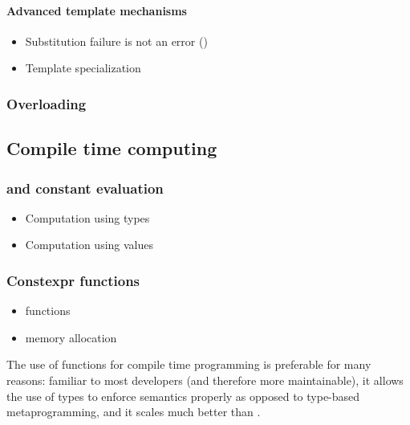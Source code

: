 \documentclass[../main]{subfiles}
\begin{document}
\paragraph{Advanced \cpp template mechanisms}

\begin{itemize}
\item Substitution failure is not an error (\sfinae)
\item Template specialization
\end{itemize}

\subsubsection{Overloading}

\subsection{Compile time computing}

\subsubsection{\Tmp and constant evaluation}

\begin{itemize}
\item Computation using types
\item Computation using values
\end{itemize}

\subsubsection{Constexpr functions}

\begin{itemize}
\item \constexpr functions
\item \constexpr memory allocation
\end{itemize}

The use of \constexpr functions for compile time programming is preferable
for many reasons: familiar to most \cpp developers (and therefore more
maintainable), it allows the use of types to enforce semantics properly
as opposed to type-based metaprogramming, and it scales much better than \tmp.
\end{document}
